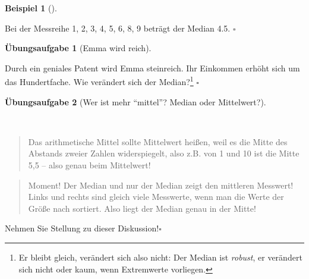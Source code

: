 \documentclass[
  letterpaper,
  oneside,
  open=any]{scrbook}
\theoremstyle{definition}
\newtheorem{exercise}{Übungsaufgabe}[chapter]
\theoremstyle{definition}
\newtheorem{example}{Beispiel}[chapter]
\theoremstyle{definition}
\theoremstyle{remark}
\begin{document}
\begin{example}[]\protect\hypertarget{exm-med2}{}\label{exm-med2}

Bei der Messreihe 1, 2, 3, 4, 5, 6, 8, 9 beträgt der Median 4.5.
\(\square\)

\end{example}

\begin{exercise}[Emma wird
reich]\protect\hypertarget{exr-md2}{}\label{exr-md2}

Durch ein geniales Patent wird Emma steinreich. Ihr Einkommen erhöht
sich um das Hundertfache. Wie verändert sich der Median?\footnote{Er
  bleibt gleich, verändert sich also nicht: Der Median ist
  \emph{robust}, er verändert sich nicht oder kaum, wenn Extremwerte
  vorliegen.} \(\square\)

\end{exercise}

\begin{exercise}[Wer ist mehr \enquote{mittel}? Median oder
Mittelwert?]\protect\hypertarget{exr-mw-md}{}\label{exr-mw-md}

~

\begin{quote}
{} Das arithmetische Mittel sollte Mittelwert heißen,
weil es die Mitte des Abstands zweier Zahlen widerspiegelt, also z.B.
von 1 und 10 ist die Mitte 5,5 -- also genau beim Mittelwert!
\end{quote}

\begin{quote}
{} Moment! Der Median und nur der Median zeigt den
mittleren Messwert! Links und rechts sind gleich viele Messwerte, wenn
man die Werte der Größe nach sortiert. Also liegt der Median genau in
der Mitte!
\end{quote}

Nehmen Sie Stellung zu dieser Diskussion!\(\square\)

\end{exercise}
\end{document}
